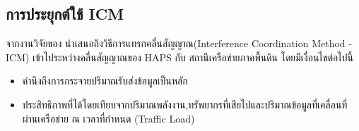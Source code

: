 \subsection{การประยุกต์ใช้ ICM}
จากงานวิจัยของ \cite[Interference Coordination Method for Integrated HAPS-Terrestrial Networks]{liu2021interference}
นำเสนอถึงวิธีการแทรกคลื่นสัญญาณ(Interference Coordination Method - ICM) เข้าไประหว่างคลื่นสัญญาณของ HAPS กับ สถานีเครือข่ายภาคพื้นดิน โดยมีเงื่อนไขต่อไปนี้
\begin{itemize}
    \item คำนึงถึงการกระจายปริมาณรับส่งข้อมูลเป็นหลัก 
    \item ประสิทธิภาพที่ได้โดยเทียบจากปริมาณพลังงาน,ทรัพยากรที่เสียไปและปริมาณข้อมูลที่เคลื่อนที่ผ่านเครือข่าย ณ เวลาที่กำหนด (Traffic Load)
\end{itemize}
